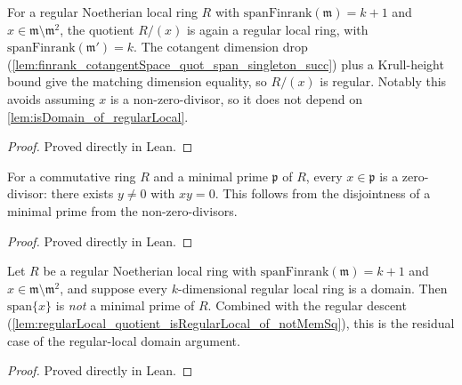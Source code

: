 \begin{lemma}
  \label{lem:regularLocal_quotient_isRegularLocal_of_notMemSq}
  For a regular Noetherian local ring \(R\) with \(\text{spanFinrank}(\mathfrak m) = k + 1\)
  and \(x \in \mathfrak m \setminus \mathfrak m^2\), the quotient \(R / (x)\) is again a regular
  local ring, with \(\text{spanFinrank}(\mathfrak m') = k\). The cotangent dimension drop
  (\cref{lem:finrank_cotangentSpace_quot_span_singleton_succ}) plus a Krull-height bound
  give the matching dimension equality, so \(R/(x)\) is regular. Notably this avoids
  assuming \(x\) is a non-zero-divisor, so it does not depend on
  \cref{lem:isDomain_of_regularLocal}.
\end{lemma}
\begin{proof}

\leanok
  Proved directly in Lean.
\end{proof}

\begin{lemma}
  \label{lem:exists_ne_zero_mul_eq_zero_of_mem_minimalPrimes}
  For a commutative ring \(R\) and a minimal prime \(\mathfrak p\) of \(R\), every
  \(x \in \mathfrak p\) is a zero-divisor: there exists \(y \neq 0\) with \(x y = 0\). This
  follows from the disjointness of a minimal prime from the non-zero-divisors.
\end{lemma}
\begin{proof}

\leanok
  Proved directly in Lean.
\end{proof}

\begin{lemma}
  \label{lem:notMem_minimalPrimes_of_regularLocal_succ}
  Let \(R\) be a regular Noetherian local ring with \(\text{spanFinrank}(\mathfrak m) = k + 1\)
  and \(x \in \mathfrak m \setminus \mathfrak m^2\), and suppose every \(k\)-dimensional regular
  local ring is a domain. Then \(\text{span}\{x\}\) is \emph{not} a minimal prime of \(R\).
  Combined with the regular descent
  (\cref{lem:regularLocal_quotient_isRegularLocal_of_notMemSq}), this is the residual
  case of the regular-local domain argument.
\end{lemma}
\begin{proof}

\leanok
  Proved directly in Lean.
\end{proof}

